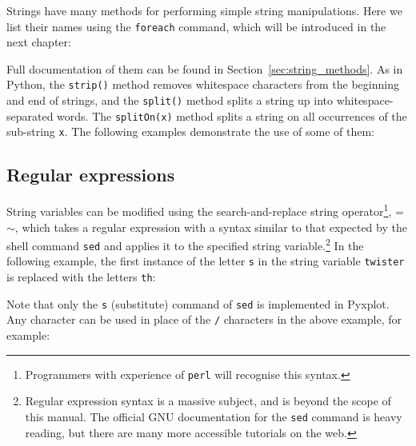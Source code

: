 Strings have many methods for performing simple string manipulations. Here we
list their names using the {\tt foreach} command, which will be introduced in
the next chapter:

\vspace{3mm}

\vspace{3mm}

\noindent Full documentation of them can be found in
Section~\ref{sec:string_methods}. As in Python, the {\tt strip()} method
removes whitespace characters from the beginning and end of strings, and the
{\tt split()} method splits a string up into whitespace-separated words. The
{\tt splitOn(x)} method splits a string on all occurrences of the sub-string
{\tt x}.  The following examples demonstrate the use of some of them:

\vspace{3mm}

\vspace{3mm}

\vspace{3mm}

\vspace{3mm}

\subsection{Regular expressions}

String variables can be modified using the search-and-replace string
operator\footnote{Programmers with
experience of {\tt perl} will recognise this syntax.}, =$\sim$, which takes a regular expression with a syntax similar to that
expected by the shell command {\tt sed} and applies it to the specified string variable.\footnote{Regular
expression syntax is a massive subject, and is beyond the scope of this manual.
The official GNU documentation for the {\tt sed} command is heavy reading, but
there are many more accessible tutorials on the web.} In the following example, the first instance of the letter {\tt s} in
the string variable {\tt twister} is replaced with the letters {\tt th}:

\vspace{3mm}

\vspace{3mm}

Note that only the {\tt s} (substitute) command of {\tt sed} is implemented in
Pyxplot. Any character can be used in place of the {\tt /} characters in the
above example, for example:

